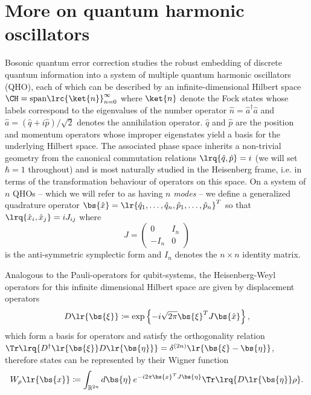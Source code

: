 \documentclass[a4paper, aps, pra, 11pt, onecolumn, tightenlines, superscriptaddress]{revtex4-2}
\begin{document}




\appendix
\section{More on quantum harmonic oscillators}\label{app:QHO}
Bosonic quantum error correction studies the robust embedding of discrete quantum information into a system of multiple quantum harmonic oscillators (QHO), each of which  can be described by an infinite-dimensional Hilbert space $\CH=\mathrm{span}\lrc{\ket{n}}_{n=0}^{\infty}$ where $\ket{n}$ denote the Fock states whose labels correspond to the eigenvalues of the number operator $\hat{n}=\hat{a}^{\dagger}\hat{a}$ and $\hat{a}=(\hat{q}+i\hat{p})/\sqrt{2}$ denotes the annihilation operator. $\hat{q}$ and $\hat{p}$ are the position and momentum operators whose improper eigenstates yield a basis for the underlying Hilbert space. The associated phase space inherits a non-trivial geometry from the canonical commutation relations $\lrq{\hat{q}, \hat{p}}=i$ (we will set $\hbar=1$ throughout) and is most naturally studied in the Heisenberg frame, i.e. in terms of the transformation behaviour of operators on this space.  On a system of $n$ QHOs -- which we will refer to as having $n$ \textit{modes} --  we define a generalized quadrature operator  $\bs{\hat{x}}=\lr{\hat{q}_1,\ldots,\hat{q}_n,\hat{p}_1,\ldots,\hat{p}_n}^T$ so that $\lrq{\hat{x}_i, \hat{x}_j}=iJ_{ij}$ where 
\begin{equation}
J=\begin{pmatrix}
0 & I_n \\ -I_n & 0
\end{pmatrix}
\end{equation} is the anti-symmetric symplectic form and $I_n$ denotes the $n \times n$ identity matrix.

Analogous to the Pauli-operators for qubit-systems, the Heisenberg-Weyl operators for this infinite dimensional Hilbert space are given by displacement operators
\begin{align}
D\lr{\bs{\xi}} \coloneqq \exp\left\{-i \sqrt{2\pi} \bs{\xi}^T J \bs{\hat{x}}\right\},
\end{align}
which form a basis for operators and  satisfy the orthogonality relation $\Tr\lrq{D^{\dagger}\lr{\bs{\xi}}D\lr{\bs{\eta}}}=\delta^{(2n)}\lr{\bs{\xi}-\bs{\eta}}$, therefore states can be represented by their Wigner function
\begin{equation}
W_{\rho}\lr{\bs{x}}
\coloneqq \int_{\mathbb{R}^{2n}} d\bs{\eta}\, e^{-i2\pi \bs{x}^T J \bs{\eta}} \Tr\lrq{D\lr{\bs{\eta}} \rho}.
\end{equation}
\end{document}
